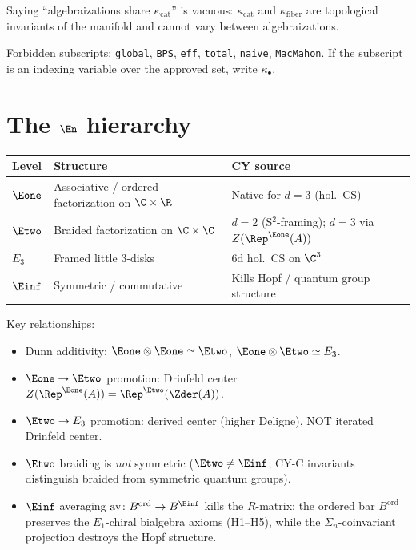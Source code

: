 \noindent
Saying ``algebraizations share $\kappa_{\mathrm{cat}}$'' is vacuous:
$\kappa_{\mathrm{cat}}$ and $\kappa_{\mathrm{fiber}}$ are topological
invariants of the manifold and cannot vary between algebraizations.

\medskip\noindent
Forbidden subscripts: \texttt{global}, \texttt{BPS}, \texttt{eff},
\texttt{total}, \texttt{naive}, \texttt{MacMahon}.  If the subscript is an
indexing variable over the approved set, write $\kappa_\bullet$.

\section{The \texorpdfstring{$\En$}{E\_n} hierarchy}
\label{sec:notation-en}

\begin{center}
\begin{tabular}{@{}lll@{}}
\toprule
\textbf{Level} & \textbf{Structure} & \textbf{CY source} \\
\midrule
$\Eone$ & Associative / ordered factorization on $\C \times \R$ & Native for $d=3$ (hol.\ CS) \\
$\Etwo$ & Braided factorization on $\C \times \C$ & $d=2$ (S$^2$-framing); $d=3$ via $Z(\Rep^{\Eone}(A))$ \\
$E_3$ & Framed little 3-disks & 6d hol.\ CS on $\C^3$ \\
$\Einf$ & Symmetric / commutative & Kills Hopf / quantum group structure \\
\bottomrule
\end{tabular}
\end{center}

\noindent
Key relationships:
\begin{itemize}[nosep]
\item Dunn additivity: $\Eone \otimes \Eone \simeq \Etwo$, \;
      $\Eone \otimes \Etwo \simeq E_3$.
\item $\Eone \to \Etwo$ promotion: Drinfeld center
      $Z(\Rep^{\Eone}(A)) = \Rep^{\Etwo}(\Zder(A))$.
\item $\Etwo \to E_3$ promotion: derived center (higher Deligne), NOT iterated
      Drinfeld center.
\item $\Etwo$ braiding is \emph{not} symmetric ($\Etwo \neq \Einf$;
      CY-C invariants distinguish braided from symmetric quantum groups).
\item $\Einf$ averaging $\mathrm{av}\colon B^{\mathrm{ord}} \to B^{\Einf}$
      kills the $R$-matrix: the ordered bar $B^{\mathrm{ord}}$ preserves the
      $E_1$-chiral bialgebra axioms (H1--H5), while the $\Sigma_n$-coinvariant
      projection destroys the Hopf structure.
\end{itemize}

